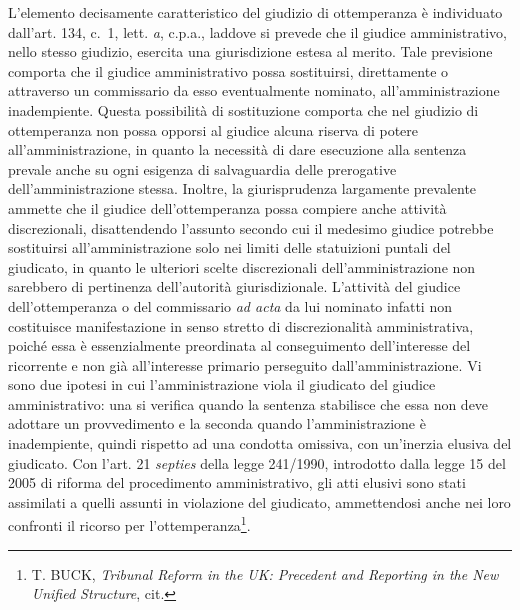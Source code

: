 \documentclass[12pt,it,a4paper,]{report}
\begin{document}
L'elemento decisamente caratteristico del giudizio di ottemperanza è
individuato dall'art. 134, c.~1, lett. \emph{a}, c.p.a., laddove si
prevede che il giudice amministrativo, nello stesso giudizio, esercita
una giurisdizione estesa al merito. Tale previsione comporta che il
giudice amministrativo possa sostituirsi, direttamente o attraverso un
commissario da esso eventualmente nominato, all'amministrazione
inadempiente. Questa possibilità di sostituzione comporta che nel
giudizio di ottemperanza non possa opporsi al giudice alcuna riserva di
potere all'amministrazione, in quanto la necessità di dare esecuzione
alla sentenza prevale anche su ogni esigenza di salvaguardia delle
prerogative dell'amministrazione stessa. Inoltre, la giurisprudenza
largamente prevalente ammette che il giudice dell'ottemperanza possa
compiere anche attività discrezionali, disattendendo l'assunto secondo
cui il medesimo giudice potrebbe sostituirsi all'amministrazione solo
nei limiti delle statuizioni puntali del giudicato, in quanto le
ulteriori scelte discrezionali dell'amministrazione non sarebbero di
pertinenza dell'autorità giurisdizionale. L'attività del giudice
dell'ottemperanza o del commissario \emph{ad acta} da lui nominato
infatti non costituisce manifestazione in senso stretto di
discrezionalità amministrativa, poiché essa è essenzialmente preordinata
al conseguimento dell'interesse del ricorrente e non già all'interesse
primario perseguito dall'amministrazione. Vi sono due ipotesi in cui
l'amministrazione viola il giudicato del giudice amministrativo: una si
verifica quando la sentenza stabilisce che essa non deve adottare un
provvedimento e la seconda quando l'amministrazione è inadempiente,
quindi rispetto ad una condotta omissiva, con un'inerzia elusiva del
giudicato. Con l'art. 21 \emph{septies} della legge 241/1990, introdotto
dalla legge 15 del 2005 di riforma del procedimento amministrativo, gli
atti elusivi sono stati assimilati a quelli assunti in violazione del
giudicato, ammettendosi anche nei loro confronti il ricorso per
l'ottemperanza\footnote{T. BUCK, \emph{Tribunal Reform in the UK:
  Precedent and Reporting in the New Unified Structure}, cit.}.
\end{document}
